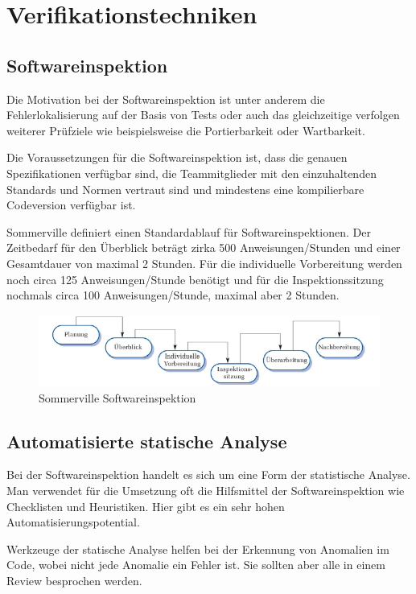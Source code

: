 \chapter{Verifikationstechniken}
\section{Softwareinspektion}
Die Motivation bei der Softwareinspektion ist unter anderem die Fehlerlokalisierung auf der Basis von Tests oder auch das gleichzeitige verfolgen weiterer Prüfziele wie beispielsweise die Portierbarkeit oder Wartbarkeit. 

Die Voraussetzungen für die Softwareinspektion ist, dass die genauen Spezifikationen verfügbar sind, die Teammitglieder mit den einzuhaltenden Standards und Normen vertraut sind und mindestens eine kompilierbare Codeversion verfügbar ist. 

Sommerville definiert einen Standardablauf für Softwareinspektionen. Der Zeitbedarf für den Überblick beträgt zirka 500 Anweisungen/Stunden und einer Gesamtdauer von maximal 2 Stunden. Für die individuelle Vorbereitung werden noch circa 125 Anweisungen/Stunde benötigt und für die Inspektionssitzung nochmals circa 100 Anweisungen/Stunde, maximal aber 2 Stunden.

\begin{figure}[hbtp]
\centering
\includegraphics[scale=0.8]{document/graphics/SwInspektion} 
\caption{Sommerville Softwareinspektion}
\end{figure}


\section{Automatisierte statische Analyse}
Bei der Softwareinspektion handelt es sich um eine Form der statistische Analyse. Man verwendet für die Umsetzung oft die Hilfsmittel der Softwareinspektion wie Checklisten und Heuristiken. Hier gibt es ein sehr hohen Automatisierungspotential. 

Werkzeuge der statische Analyse helfen bei der Erkennung von Anomalien im Code, wobei nicht jede Anomalie ein Fehler ist. Sie sollten aber alle in einem Review besprochen werden.

